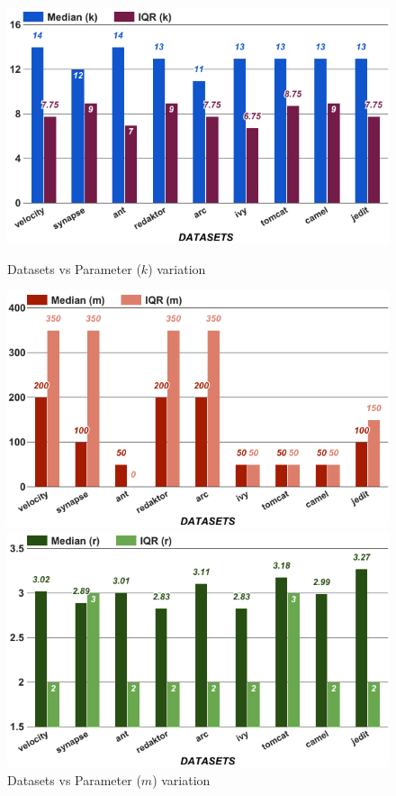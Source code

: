 \begin{figure}[!t]
    \centering
    \begin{minipage}{.33\textwidth}
        \captionsetup{justification=centering,singlelinecheck=off}
        \includegraphics[width=\linewidth]{./fig/k.png}
        \caption{Datasets vs Parameter ($k$) variation}
        \label{RQ3:k}
    \end{minipage}%
    \begin{minipage}{.33\textwidth}
        \captionsetup{labelsep=space,justification=centering,singlelinecheck=off}
        \includegraphics[width=\linewidth]{./fig/m.png}
        \caption{Datasets vs Parameter ($m$) variation}
        \label{RQ3:a}
    \end{minipage}
    \begin{minipage}{.33\textwidth}
        \captionsetup{labelsep=space,justification=centering,singlelinecheck=off}
        \includegraphics[width=\linewidth]{./fig/r.png}

\end{minipage}
\end{figure}
